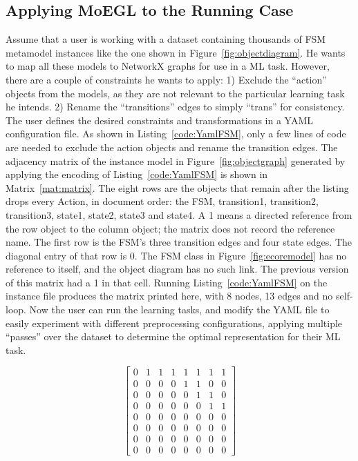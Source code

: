 \documentclass[journal,article,submit,moreauthors,technologies]{Definitions/mdpi}
\newcommand{\rev}[1]{#1}
\begin{document}
\subsection{Applying MoEGL to the Running Case}\label{sec:applying}
Assume that a user is working with a dataset containing thousands of FSM metamodel instances like the one shown in Figure~\ref{fig:objectdiagram}. He wants to map all these models to NetworkX graphs for use in a ML task. However, there are a couple of constraints he wants to apply: 1) Exclude the ``action'' objects from the models, as they are not relevant to the particular learning task he intends. 2) Rename the ``transitions'' edges to simply ``trans'' for consistency.
The user defines the desired constraints and transformations in a YAML configuration file. As shown in Listing~\ref{code:YamlFSM}, only a few lines of code are needed to exclude the action objects and rename the transition edges.
The adjacency matrix of the instance model in Figure~\ref{fig:objectgraph} generated by applying the encoding of Listing~\ref{code:YamlFSM} is shown in Matrix~\ref{mat:matrix}.
\rev{The eight rows are the objects that remain after the listing drops every Action, in document order: the FSM, transition1, transition2, transition3, state1, state2, state3 and state4. A 1 means a directed reference from the row object to the column object; the matrix does not record the reference name. The first row is the FSM's three transition edges and four state edges. The diagonal entry of that row is 0. The FSM class in Figure~\ref{fig:ecoremodel} has no reference to itself, and the object diagram has no such link. The previous version of this matrix had a 1 in that cell. Running Listing~\ref{code:YamlFSM} on the instance file produces the matrix printed here, with 8 nodes, 13 edges and no self-loop.}
Now the user can run the learning tasks, and modify the YAML file to easily experiment with different preprocessing configurations, applying multiple ``passes'' over the dataset to determine the optimal representation for their ML task.

\begin{mat}[H]
\begin{equation}
    \begin{bmatrix}
0 & 1 & 1 & 1 & 1 & 1 & 1 & 1 \\
0 & 0 & 0 & 0 & 1 & 1 & 0 & 0 \\
0 & 0 & 0 & 0 & 0 & 1 & 1 & 0 \\
0 & 0 & 0 & 0 & 0 & 0 & 1 & 1 \\
0 & 0 & 0 & 0 & 0 & 0 & 0 & 0 \\
0 & 0 & 0 & 0 & 0 & 0 & 0 & 0 \\
0 & 0 & 0 & 0 & 0 & 0 & 0 & 0 \\
0 & 0 & 0 & 0 & 0 & 0 & 0 & 0
    \end{bmatrix}
\end{equation}
\caption{\rev{Adjacency matrix produced by running Listing~\ref{code:YamlFSM}. The diagonal is 0: the FSM object has no edge to itself.}}
\label{mat:matrix}
\end{mat}
\end{document}
